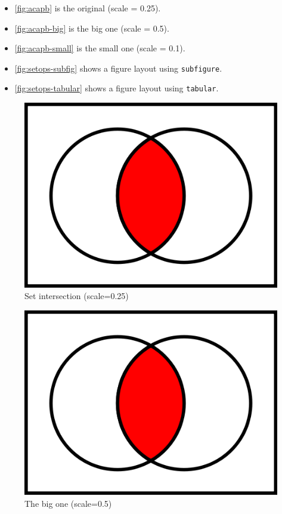 \documentclass[12pt]{article}
\theoremstyle{plain}
\theoremstyle{definition}
\theoremstyle{remark}
\theoremstyle{mystyle}
\begin{document}
\begin{itemize}
\item \autoref{fig:acapb} is the original (scale = 0.25).
\item \autoref{fig:acapb-big} is the big one (scale = 0.5).
\item \autoref{fig:acapb-small} is the small one (scale = 0.1).
\item \autoref{fig:setops-subfig} shows a figure layout using \texttt{subfigure}.
\item \autoref{fig:setops-tabular} shows a figure layout using \texttt{tabular}. %
\end{itemize}

\begin{figure}[ht]
\centering
\includegraphics[scale=0.25]{AcapB}
\caption{Set intersection (scale=0.25)\label{fig:acapb}}
\end{figure}

\begin{figure}[ht]
\centering
\includegraphics[scale=0.5]{AcapB}
\caption{The big one (scale=0.5)\label{fig:acapb-big}}
\end{figure}
\end{document}
